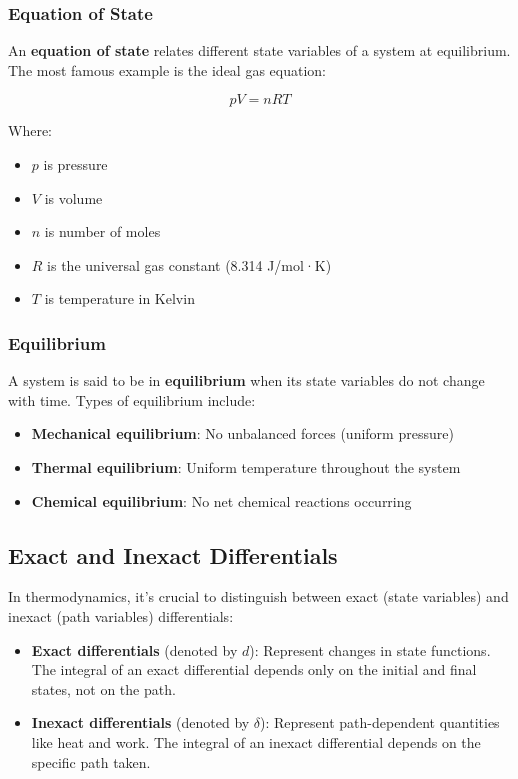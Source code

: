 \documentclass{article}
\theoremstyle{definition}
\begin{document}
\subsubsection{Equation of State}
An \textbf{equation of state} relates different state variables of a system at equilibrium. The most famous example is the ideal gas equation:

\[
pV = nRT
\]

Where:
\begin{itemize}
    \item $p$ is pressure
    \item $V$ is volume
    \item $n$ is number of moles
    \item $R$ is the universal gas constant (8.314 J/mol·K)
    \item $T$ is temperature in Kelvin
\end{itemize}

\subsubsection{Equilibrium}
A system is said to be in \textbf{equilibrium} when its state variables do not change with time. Types of equilibrium include:

\begin{itemize}
    \item \textbf{Mechanical equilibrium}: No unbalanced forces (uniform pressure)
    \item \textbf{Thermal equilibrium}: Uniform temperature throughout the system
    \item \textbf{Chemical equilibrium}: No net chemical reactions occurring
\end{itemize}

\subsection{Exact and Inexact Differentials}

In thermodynamics, it's crucial to distinguish between exact (state variables) and inexact (path variables) differentials:

\begin{itemize}
    \item \textbf{Exact differentials} (denoted by $d$): Represent changes in state functions. The integral of an exact differential depends only on the initial and final states, not on the path.
    \item \textbf{Inexact differentials} (denoted by $\delta$): Represent path-dependent quantities like heat and work. The integral of an inexact differential depends on the specific path taken.
\end{itemize}
\end{document}
